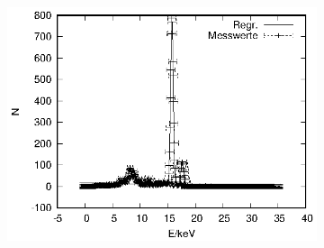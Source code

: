 \begin{figure}[!h]
\begin{subfigure}[h]{0.5\textwidth}
  \end{subfigure}%
  \begin{subfigure}[h]{0.5\textwidth}
    \centering
    \includegraphics{data/Massenanteil/zr.eps}
  \end{subfigure}
\end{figure}

\newpage

